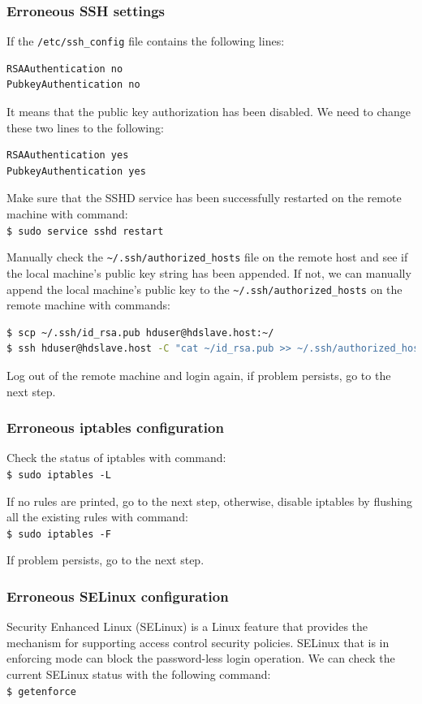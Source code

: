 \subsubsection*{Erroneous SSH settings}
If the \verb|/etc/ssh_config| file contains the following lines:
\begin{verbatim}
RSAAuthentication no
PubkeyAuthentication no
\end{verbatim}

It means that the public key authorization has been disabled. We need to change these two lines to the following:
\begin{verbatim}
RSAAuthentication yes
PubkeyAuthentication yes
\end{verbatim}

Make sure that the SSHD service has been successfully restarted on the remote machine with command: \\
\verb|$ sudo service sshd restart|

Manually check the \verb|~/.ssh/authorized_hosts| file on the remote host and see if the local machine's public key string has been appended. If not, we can manually append the local machine's public key to the \verb|~/.ssh/authorized_hosts| on the remote machine with commands:
\lstset{style=bashstyle}
\begin{lstlisting}[language=bash]
$ scp ~/.ssh/id_rsa.pub hduser@hdslave.host:~/
$ ssh hduser@hdslave.host -C "cat ~/id_rsa.pub >> ~/.ssh/authorized_hosts"
\end{lstlisting}

Log out of the remote machine and login again, if problem persists, go to the next step.
\subsubsection*{Erroneous iptables configuration}
Check the status of iptables with command: \\
\verb|$ sudo iptables -L|

If no rules are printed, go to the next step, otherwise, disable iptables by flushing all the existing rules with command: \\
\verb|$ sudo iptables -F|

If problem persists, go to the next step.
\subsubsection*{Erroneous SELinux configuration}
Security Enhanced Linux (SELinux) is a Linux feature that provides the mechanism for supporting access control security policies. SELinux that is in enforcing mode can block the password-less login operation. We can check the current SELinux status with the following command: \\
\verb|$ getenforce|

